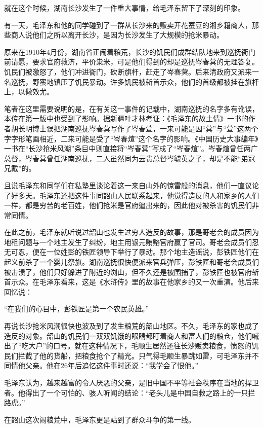 \documentclass[../../dazhuan.tex]{subfiles}
\begin{document}
就在这个时候，湖南长沙发生了一件重大事情，给毛泽东留下了深刻的印象。

有一天，毛泽东和他的同学碰到了一群从长沙来的贩卖开花蚕豆的湘乡籍商人，那些商人说他们之所以离开长沙，是因为长沙发生了大规模的抢米暴动。  

原来在1910年4月份，湖南省正闹着粮荒，长沙的饥民们成群结队地来到巡抚衙门前请愿，要求官府救济，平价粜米，可是他们得到的却是巡抚岑春蓂的无理答复。饥民们被激怒了，他们冲进衙门，砍断旗杆，赶走了岑春蓂。后来清政府又派来一名巡抚，野蛮地镇压了饥民暴动。许多饥民被斩首示众，他们的首级都被挂在旗杆上，以儆效尤。

笔者在这里需要说明的是，在有关这一事件的记载中，湖南巡抚的名字多有讹误，本传在第一版中也受到了影响。据新疆叶才林考证：《毛泽东的故土情》一书的作者胡长明博士误把湖南巡抚岑春蓂写作了岑春萱，一来可能是因“蓂”与“萱”这两个字字形笔画相近，二来可能是受了“岑春煊”这个名字的影响。《中国历史大事编年》一书在“长沙抢米风潮”条目中则直接将“岑春蓂”写成了“岑春煊”。岑春煊曾任两广总督，岑春蓂曾任湖南巡抚，二人虽然同为云贵总督岑毓英之子，却是不能“弟冠兄戴”的。

且说毛泽东和同学们在私塾里谈论着这一来自山外的惊雷般的消息，他们一直议论了好多天。毛泽东还把这件事同韶山人民联系起来，他觉得造反的人和家乡的人们一样，都是穷苦的老百姓，他们抢米是官府逼出来的，因此他对被杀害的饥民们非常同情。

在此之前，毛泽东就听说过韶山也发生过穷人造反的故事，那是哥老会的成员因为地租问题与一个地主发生了纠纷，地主用银元贿赂官府赢了官司。哥老会成员们忍无可忍，便在一位姓彭的铁匠领导下举行了暴动。那个地主造谣说，彭铁匠他们在起义前杀了一个婴儿祭旗。湖南巡抚很快便派来官兵弹压，彭铁匠和哥老会成员们被击溃了，他们只好躲进了附近的浏山，但不久还是被围捕了，彭铁匠也被官府斩首示众。在毛泽东看来，这是《水浒传》里的故事在他家乡的又一次重演。他后来回忆说：

“在我们的心目中，彭铁匠是第一个农民英雄。”

再说长沙抢米风潮很快也波及到了发生粮荒的韶山地区。不久，毛泽东的家也成了造反的对象。韶山的饥民们一双双饥饿的眼睛都盯着商人和富人们的粮仓，他们喊出了“吃大户”的口号。就在这种情况下，毛顺生居然还往长沙贩卖粮食，愤怒的饥民们拦截了他的货船，把粮食抢个了精光。只气得毛顺生暴跳如雷，可毛泽东并不同情他父亲。他在26年后追忆这件事时还说：“我学会了恨他。”

毛泽东认为，越来越富的令人厌恶的父亲，是旧中国不平等社会秩序在当地的捍卫者。他得出了一个可怕的、骇人听闻的结论：“老头儿是中国自救之路上的一只拦路虎。”

在韶山这次闹粮荒中，毛泽东更是站到了群众斗争的第一线。
\end{document}

